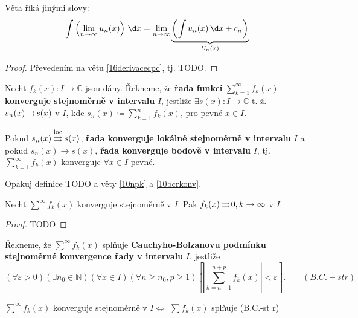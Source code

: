 \begin{poznamka}
    Věta říká jinými slovy:
    $$\int\left(\lim_{n\to\infty}u_n(x)\right)\,\d x = \lim_{n\to\infty}\underbrace{\left(\int u_n(x) \,\d x + c_n\right)}_{\mathclap{U_n(x)}}$$
\end{poznamka}

\begin{proof}
    Převedením na větu \ref{16derivacecpc}, tj. TODO.
\end{proof}

\begin{definice}
    Nechť $f_k(x)\colon I \to \mathbb C$ jsou dány. Řekneme, že \textbf{řada funkcí} $\sum_{k=1}^{\infty}f_k(x)$ \textbf{konverguje stejnoměrně v intervalu} $I$, jestliže $\exists s(x)\colon I \to \mathbb C$ t. ž. $s_n(x)\operatorname{\rightrightarrows} s(x)$ v $I$, kde $s_n(x)\coloneq \sum_{k=1}^{n} f_k(x)$, pro pevné $x \in I$.

    Pokud $s_n(x)\stackrel{\text{loc}}{\operatorname{\rightrightarrows}}s(x)$, \textbf{řada konverguje lokálně stejnoměrně v intervalu} $I$ a pokud $s_n(x)\to s(x)$, \textbf{řada konverguje bodově v intervalu} $I$, tj. $\sum_{k=1}^{\infty}f_k(x)$ konverguje $\forall x \in I$ pevné.
\end{definice}

\begin{poznamka}
    Opakuj definice TODO a věty \ref{10npk} a \ref{10bcrkonv}.
\end{poznamka}

\begin{veta}
    Nechť $\sum^\infty f_k(x)$ konverguje stejnoměrně v $I$. Pak $f_k(x)\operatorname{\rightrightarrows} 0, k \to \infty$ v $I$.
\end{veta}

\begin{proof}
    TODO
\end{proof}

\begin{definice}
    Řekneme, že $\sum^\infty f_k(x)$ splňuje \textbf{Cauchyho-Bolzanovu podmínku stejnoměrné konvergence řady v intervalu} $I$, jestliže
    $$\left(\forall \varepsilon>0\right)\left(\exists n_0 \in \mathbb N\right)\left(\forall x \in I\right)\left(\forall n \geq n_0, p \geq 1\right)\left[\left|\sum_{k=n+1}^{n+p}f_k(x)\right|<\varepsilon\right].\qquad (B.C.-st r)$$
\end{definice}

\begin{veta}
    $\sum^\infty f_k(x)$ konverguje stejnoměrně v $I\iff$ $\sum f_k(x)$ splňuje (B.C.-st r)
\end{veta}

